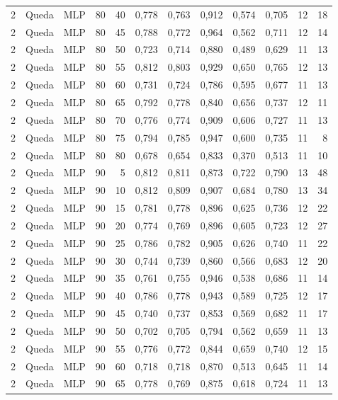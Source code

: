 \begin{longtable}{ccclrrrrrrrr}
2 & Queda & MLP & 80 & 40 & 0,778 & 0,763 & 0,912 & 0,574 & 0,705 & 12 & 18 \\
2 & Queda & MLP & 80 & 45 & 0,788 & 0,772 & 0,964 & 0,562 & 0,711 & 12 & 14 \\
2 & Queda & MLP & 80 & 50 & 0,723 & 0,714 & 0,880 & 0,489 & 0,629 & 11 & 13 \\
2 & Queda & MLP & 80 & 55 & 0,812 & 0,803 & 0,929 & 0,650 & 0,765 & 12 & 13 \\
2 & Queda & MLP & 80 & 60 & 0,731 & 0,724 & 0,786 & 0,595 & 0,677 & 11 & 13 \\
2 & Queda & MLP & 80 & 65 & 0,792 & 0,778 & 0,840 & 0,656 & 0,737 & 12 & 11 \\
2 & Queda & MLP & 80 & 70 & 0,776 & 0,774 & 0,909 & 0,606 & 0,727 & 11 & 13 \\
2 & Queda & MLP & 80 & 75 & 0,794 & 0,785 & 0,947 & 0,600 & 0,735 & 11 & 8 \\
2 & Queda & MLP & 80 & 80 & 0,678 & 0,654 & 0,833 & 0,370 & 0,513 & 11 & 10 \\
2 & Queda & MLP & 90 & 5 & 0,812 & 0,811 & 0,873 & 0,722 & 0,790 & 13 & 48 \\
2 & Queda & MLP & 90 & 10 & 0,812 & 0,809 & 0,907 & 0,684 & 0,780 & 13 & 34 \\
2 & Queda & MLP & 90 & 15 & 0,781 & 0,778 & 0,896 & 0,625 & 0,736 & 12 & 22 \\
2 & Queda & MLP & 90 & 20 & 0,774 & 0,769 & 0,896 & 0,605 & 0,723 & 12 & 27 \\
2 & Queda & MLP & 90 & 25 & 0,786 & 0,782 & 0,905 & 0,626 & 0,740 & 11 & 22 \\
2 & Queda & MLP & 90 & 30 & 0,744 & 0,739 & 0,860 & 0,566 & 0,683 & 12 & 20 \\
2 & Queda & MLP & 90 & 35 & 0,761 & 0,755 & 0,946 & 0,538 & 0,686 & 11 & 14 \\
2 & Queda & MLP & 90 & 40 & 0,786 & 0,778 & 0,943 & 0,589 & 0,725 & 12 & 17 \\
2 & Queda & MLP & 90 & 45 & 0,740 & 0,737 & 0,853 & 0,569 & 0,682 & 11 & 17 \\
2 & Queda & MLP & 90 & 50 & 0,702 & 0,705 & 0,794 & 0,562 & 0,659 & 11 & 13 \\
2 & Queda & MLP & 90 & 55 & 0,776 & 0,772 & 0,844 & 0,659 & 0,740 & 12 & 15 \\
2 & Queda & MLP & 90 & 60 & 0,718 & 0,718 & 0,870 & 0,513 & 0,645 & 11 & 14 \\
2 & Queda & MLP & 90 & 65 & 0,778 & 0,769 & 0,875 & 0,618 & 0,724 & 11 & 13 \\

\end{longtable}
